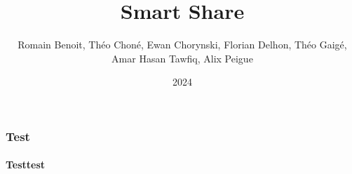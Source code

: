 \documentclass{beamer}
\title[Smart Share]{Smart Share}
\author[Hexanomnom]{Romain Benoit, Théo Choné, Ewan Chorynski, Florian Delhon, Théo Gaigé, Amar Hasan Tawfiq, Alix Peigue}
\institute[INSA Lyon]{INSA Lyon}
\date{2024}
\begin{document}
\begin{frame}
    \frametitle{Test}
    \framesubtitle{Testtest}
\end{frame}
\end{document}
